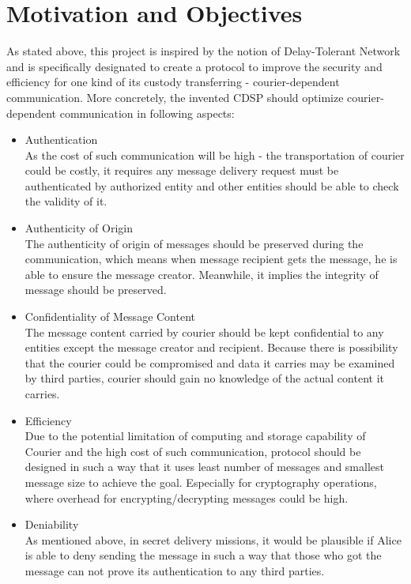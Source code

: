 \section{Motivation and Objectives}
As stated above, this project is inspired by the notion of Delay-Tolerant Network and is specifically designated to create a protocol to improve the security and efficiency for one kind of its custody transferring - courier-dependent communication. More concretely, the invented CDSP should optimize courier-dependent communication in following aspects:
\begin{itemize}
\item Authentication \\
As the cost of such communication will be high - the transportation of courier could be costly, it requires any message delivery request must be authenticated by authorized entity and other entities should be able to check the validity of it.

\item Authenticity of Origin \\
The authenticity of origin of messages should be preserved during the communication, which means when message recipient gets the message, he is able to ensure the message creator. Meanwhile, it implies the integrity of message should be preserved.

\item Confidentiality of Message Content \\
The message content carried by courier should be kept confidential to any entities except the message creator and recipient. Because there is possibility that the courier could be compromised and data it carries may be examined by third parties, courier should gain no knowledge of the actual content it carries.

\item Efficiency \\
Due to the potential limitation of computing and storage capability of Courier and the high cost of such communication, protocol should be designed in such a way that it uses least number of messages and smallest message size to achieve the goal. Especially for cryptography operations, where overhead for encrypting/decrypting messages could be high.

\item Deniability \\
As mentioned above, in secret delivery missions, it would be plausible if Alice is able to deny sending the message in such a way that those who got the message can not prove its authentication to any third parties.
\end{itemize}

